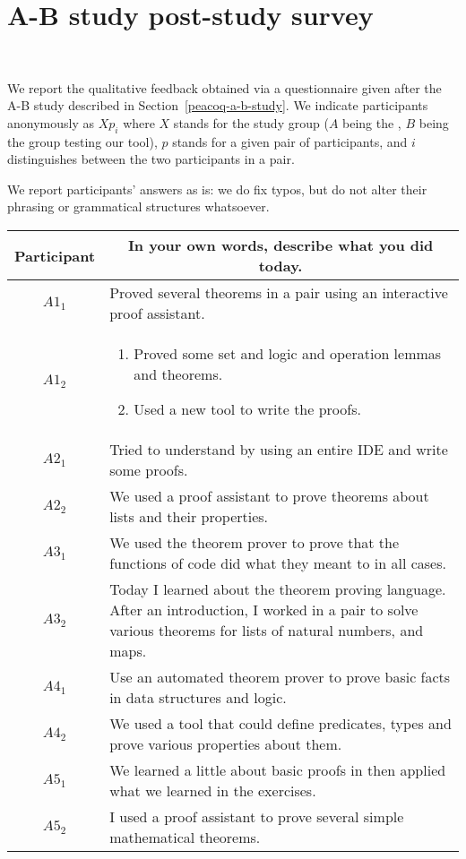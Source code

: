 \chapter{\PeaCoq{} A-B study post-study survey}~\label{appendix-peacoq-a-b-study}

We report the qualitative feedback obtained via a questionnaire given after the
A-B study described in Section~\ref{peacoq-a-b-study}.  We indicate participants
anonymously as $Xp_{i}$ where $X$ stands for the study group ($A$ being the
, $B$ being the group testing our tool), $p$ stands for a
given pair of participants, and $i$ distinguishes between the two participants
in a pair.

We report participants' answers as is: we do fix typos, but do not alter their
phrasing or grammatical structures whatsoever.

\clearpage

\noindent
\begin{tabularx}{\linewidth}{@{}cX@{}}
  \toprule
  Participant & \multicolumn{1}{c}{
    \textbf{In your own words, describe what you did today.}
  } \\ \midrule
  $A1_{1}$ & Proved several theorems in a pair using an interactive proof assistant. \\
  $A1_{2}$ & \begin{enumerate} \item Proved some set and logic and operation lemmas and theorems. \item Used a new tool to write the proofs. \end{enumerate} \\
  $A2_{1}$ & Tried to understand \Coq{} by using an entire IDE and write some proofs. \\
  $A2_{2}$ & We used a proof assistant to prove theorems about lists and their properties. \\
  $A3_{1}$ & We used the theorem prover to prove that the functions of code did what they meant to in all cases. \\
  $A3_{2}$ & Today I learned about the \Coq{} theorem proving language.  After an introduction, I worked in a pair to solve various theorems for lists of natural numbers, and maps. \\
  $A4_{1}$ & Use an automated theorem prover to prove basic facts in data structures and logic. \\
  $A4_{2}$ & We used a tool that could define predicates, types and prove various properties about them. \\
  $A5_{1}$ & We learned a little about basic proofs in \Coq{} then applied what we learned in the exercises. \\
  $A5_{2}$ & I used a proof assistant to prove several simple mathematical theorems. \\
  \bottomrule
\end{tabularx}{\parfillskip=0pt\par}

